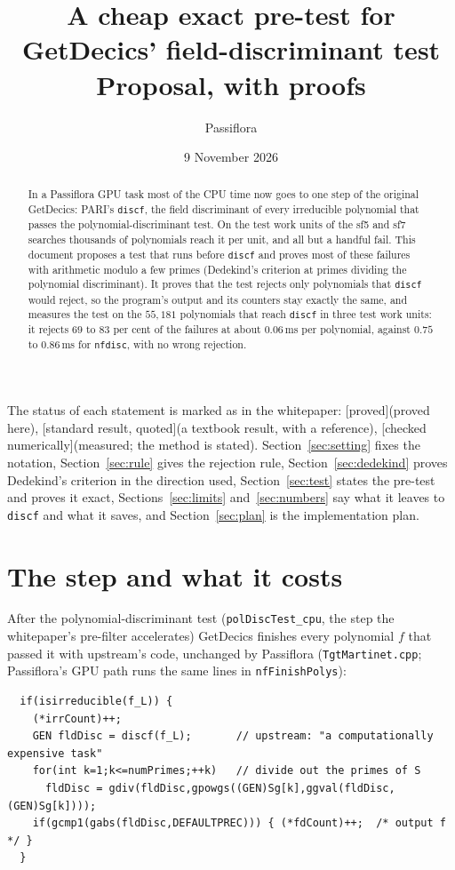 \documentclass[10pt,a4paper]{article}
\title{A cheap exact pre-test for GetDecics' field-discriminant test\\[2pt] \large Proposal, with proofs}
\author{Passiflora}
\date{9 November 2026}
\newcommand{\code}[1]{\texttt{#1}}
\newcommand{\stproved}{\textsf{\small[proved]}\xspace}
\newcommand{\stquoted}{\textsf{\small[standard result, quoted]}\xspace}
\newcommand{\stnum}{\textsf{\small[checked numerically]}\xspace}
\theoremstyle{plain}
\theoremstyle{definition}
\begin{document}
\maketitle

\begin{abstract}
In a Passiflora GPU task most of the CPU time now goes to one step of the original GetDecics: PARI's \code{discf}, the field
discriminant of every irreducible polynomial that passes the polynomial-discriminant test.  On the test work units of the sf5 and sf7
searches thousands of polynomials reach it per unit, and all but a handful fail.  This document proposes a test that runs before
\code{discf} and proves most of these failures with arithmetic modulo a few primes (Dedekind's criterion at primes dividing the
polynomial discriminant).  It proves that the test rejects only polynomials that \code{discf} would reject, so the program's output and
its counters stay exactly the same, and measures the test on the $55{,}181$ polynomials that reach \code{discf} in three test work
units: it rejects $69$ to $83$ per cent of the failures at about $0.06$\,ms per polynomial, against $0.75$ to $0.86$\,ms for
\code{nfdisc}, with no wrong rejection.
\end{abstract}

\noindent The status of each statement is marked as in the whitepaper: \stproved (proved here), \stquoted (a textbook result,
with a reference), \stnum (measured; the method is stated).  Section~\ref{sec:setting} fixes the notation, Section~\ref{sec:rule}
gives the rejection rule, Section~\ref{sec:dedekind} proves Dedekind's criterion in the direction used, Section~\ref{sec:test}
states the pre-test and proves it exact, Sections~\ref{sec:limits} and~\ref{sec:numbers} say what it leaves to \code{discf} and
what it saves, and Section~\ref{sec:plan} is the implementation plan.

\section{The step and what it costs}\label{sec:step}

After the polynomial-discriminant test (\code{polDiscTest\_cpu}, the step the whitepaper's pre-filter accelerates) GetDecics finishes
every polynomial $f$ that passed it with upstream's code, unchanged by Passiflora (\code{TgtMartinet.cpp}; Passiflora's GPU path
runs the same lines in \code{nfFinishPolys}):

\begin{verbatim}
  if(isirreducible(f_L)) {
    (*irrCount)++;
    GEN fldDisc = discf(f_L);       // upstream: "a computationally expensive task"
    for(int k=1;k<=numPrimes;++k)   // divide out the primes of S
      fldDisc = gdiv(fldDisc,gpowgs((GEN)Sg[k],ggval(fldDisc,(GEN)Sg[k])));
    if(gcmp1(gabs(fldDisc,DEFAULTPREC))) { (*fdCount)++;  /* output f */ }
  }
\end{verbatim}
\end{document}
